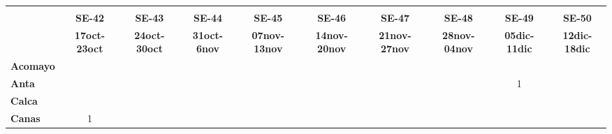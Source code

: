 \begin{tabular}{lccccccccc}
	\textbf{}              & \multicolumn{1}{l}{}                        & \multicolumn{1}{l}{}      & \multicolumn{1}{l}{}                         & \multicolumn{1}{l}{}                         & \multicolumn{1}{l}{}                         & \multicolumn{1}{l}{}                        & \multicolumn{1}{l}{}                         & \multicolumn{1}{l}{}                         & \multicolumn{1}{l}{}     \\
	\textbf{}                                                                                 
    &\textbf{SE-42}                   &\textbf{SE-43}                  
	&\textbf{SE-44} 
	&\textbf{SE-45} 							&\textbf{SE-46} 
	&\textbf{SE-47}								&\textbf{SE-48}  				  &\textbf{SE-49}
	&\textbf{SE-50}\\
		\textbf{}              
	&\textbf{17oct-23oct} 						&\textbf{24oct-30oct} 		       &\textbf{31oct-6nov}  						&\textbf{07nov-13nov} 
	&\textbf{14nov-20nov} 						&\textbf{21nov-27nov} 	  		&\textbf{28nov-04nov} 	
	&\textbf{05dic-11dic}						&\textbf{12dic-18dic}\\
	\textbf{Acomayo}                        	
	&\cellcolor[HTML]{FCC46C}                   &\cellcolor[HTML]{FCC46C}          			&\cellcolor[HTML]{FCC46C}                  
	&\cellcolor[HTML]{FCC46C}  			        &\cellcolor[HTML]{FCC46C}          &\cellcolor[HTML]{FCC46C} 					&\cellcolor[HTML]{FCC46C} 	    &\cellcolor[HTML]{FCC46C}
	&\cellcolor[HTML]{FCC46C}\\
	\textbf{Anta}                                                          		
	&\cellcolor[HTML]{FCC46C}         &\cellcolor[HTML]{FCC46C} 			    
	&\cellcolor[HTML]{FCC46C} 				    &\cellcolor[HTML]{FCC46C}		  &\cellcolor[HTML]{FCC46C}					&\cellcolor[HTML]{FCC46C}					
	&\cellcolor[HTML]{FCC46C} 					&1
	&\cellcolor[HTML]{FCC46C}\\
	\textbf{Calca}      				       
	&\cellcolor[HTML]{FCC46C}         			&\cellcolor[HTML]{FCC46C}       
	&\cellcolor[HTML]{FCC46C}                   &\cellcolor[HTML]{FCC46C}         &\cellcolor[HTML]{FCC46C}                
	&\cellcolor[HTML]{FCC46C}                   &\cellcolor[HTML]{FCC46C}  		  &\cellcolor[HTML]{FCC46C} 					&\cellcolor[HTML]{FCC46C} 				   \\                										
	\textbf{Canas}                              
	&1        			              			&\cellcolor[HTML]{FCC46C}                   &\cellcolor[HTML]{FCC46C} 					&\cellcolor[HTML]{FCC46C}       			&\cellcolor[HTML]{FCC46C} 
	&\cellcolor[HTML]{FCC46C} 					&\cellcolor[HTML]{FCC46C} 		&\cellcolor[HTML]{FCC46C}					&\cellcolor[HTML]{FCC46C}\\

\end{tabular}
